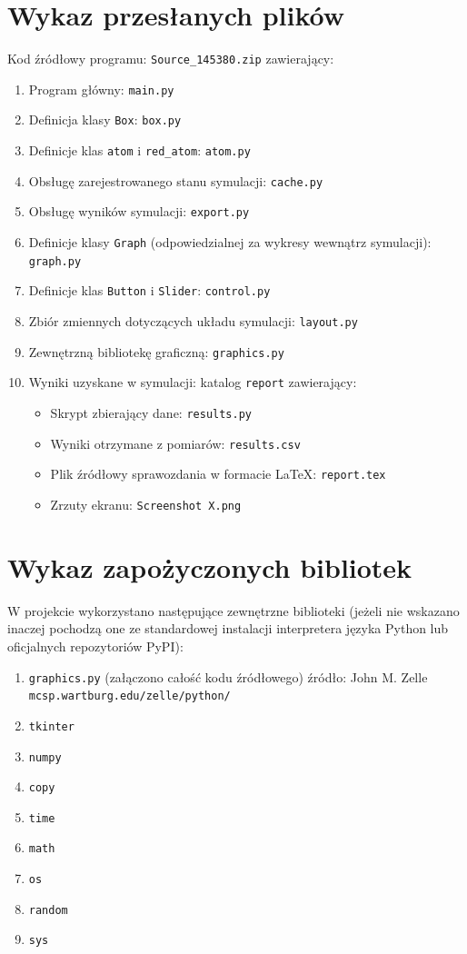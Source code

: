 \documentclass{article}
\begin{document}
\section{Wykaz przesłanych plików}
    Kod źródłowy programu: \verb+Source_145380.zip+ zawierający:
    \begin{enumerate}
        \item Program główny: \verb+main.py+
        \item Definicja klasy \verb+Box+: \verb+box.py+
        \item Definicje klas \verb+atom+ i \verb+red_atom+: \verb+atom.py+
        \item Obsługę zarejestrowanego stanu symulacji: \verb+cache.py+
        \item Obsługę wyników symulacji: \verb+export.py+
        \item Definicje klasy \verb+Graph+ (odpowiedzialnej za wykresy wewnątrz symulacji): \verb+graph.py+
        \item Definicje klas \verb+Button+ i \verb+Slider+: \verb+control.py+
        \item Zbiór zmiennych dotyczących układu symulacji: \verb+layout.py+
        \item Zewnętrzną bibliotekę graficzną: \verb+graphics.py+
        \item Wyniki uzyskane w symulacji: katalog \verb+report+ zawierający:
        \begin{itemize}
            \item Skrypt zbierający dane: \verb+results.py+
            \item Wyniki otrzymane z pomiarów: \verb+results.csv+
            \item Plik źródłowy sprawozdania w formacie \LaTeX: \verb+report.tex+
            \item Zrzuty ekranu: \verb+Screenshot X.png+
        \end{itemize}
    \end{enumerate}
\section{Wykaz zapożyczonych bibliotek}
W projekcie wykorzystano następujące zewnętrzne biblioteki (jeżeli nie wskazano inaczej pochodzą one ze standardowej instalacji interpretera języka Python lub oficjalnych repozytoriów PyPI):
    \begin{enumerate}
        \item \verb+graphics.py+ (załączono całość kodu źródłowego) źródło: John M. Zelle \verb+mcsp.wartburg.edu/zelle/python/+
        \item \verb+tkinter+
        \item \verb+numpy+
        \item \verb+copy+
        \item \verb+time+
        \item \verb+math+
        \item \verb+os+
        \item \verb+random+
        \item \verb+sys+
    \end{enumerate}
\end{document}
